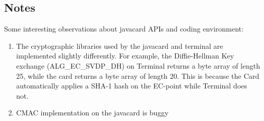 \documentclass[a4paper,10pt]{llncs}
\begin{document}
\subsection{Notes}
Some interesting observations about javacard APIs and coding environment:

\begin{enumerate}
 \item The cryptographic libraries used by the javacard and terminal are implemented slightly differently. For example, the Diffie-Hellman Key exchange (ALG\_EC\_SVDP\_DH) on Terminal returns a byte array of length 25, while the card returns a byte array of length 20. This is because the Card automatically applies a SHA-1 hash on the EC-point while Terminal does not.
 \item CMAC implementation on the javacard is buggy
\end{enumerate}
 
\end{document}
